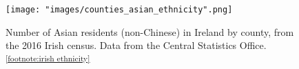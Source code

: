 \documentclass[a4paper,11pt]{article}
\begin{document}
\begin{figure}[htb]
   \centering
   \texttt{[image: "images/counties\_asian\_ethnicity".png]}
      \caption{Number of Asian residents (non-Chinese) in Ireland by county, from the 2016 Irish census. Data from the Central Statistics Office.\textsuperscript{\ref{footnote:irish ethnicity}}}
      \label{fig:asian by county}
\end{figure}











\end{document}

